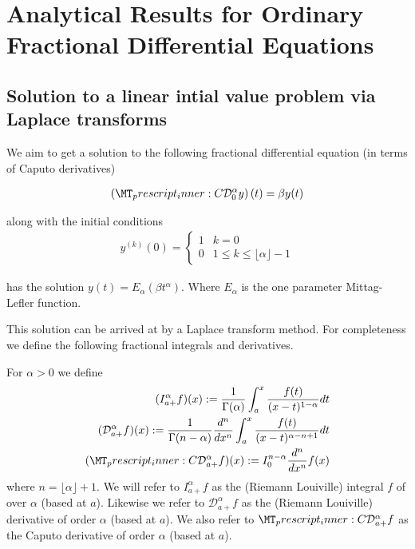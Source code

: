 \section{Analytical Results for Ordinary Fractional Differential Equations}
\subsection{Solution to a linear intial value problem via Laplace transforms}
We aim to get a solution to the following fractional differential equation (in terms of Caputo derivatives)

\begin{align}
	\label{eq:fde-1}
	\left( \prescript{C}{}{\mathcal{D}_0^\alpha}y \right)(t) = \beta y(t) 
\end{align}

along with the initial conditions 
\begin{align}
	\label{eq:fde-1-ic}
	y^{(k)}(0) = 
	\begin{cases}
		1 & k = 0 \\
		0 & 1 \leq k \leq \lfloor\alpha \rfloor - 1  
	\end{cases}
\end{align}

has the solution $ y(t) = E_\alpha \left( \beta t^\alpha \right) $. Where $ E_\alpha $ is the one parameter Mittag-Lefler function.

This solution can be arrived at by a Laplace transform method. For completeness we define the following fractional
integrals and derivatives.

\begin{definition}
	For $ \alpha > 0 $ we define
	\begin{align*}
		(I_{a+}^{\alpha}f)(x) := \frac{1}{\Gamma(\alpha)}\int_a^x \frac{f(t)}{(x-t)^{1 - \alpha}} dt \\
		(\mathcal{D}_{a+}^{\alpha}f)(x) := \frac{1}{\Gamma(n-\alpha)} \frac{d^n}{dx^n}\int_a^x \frac{f(t)}{(x-t)^{\alpha - n + 1}} dt \\
		(\prescript{C}{}{\mathcal{D}}_{a+}^\alpha f)(x) := I_{0}^{n-\alpha} \frac{d^n}{dx^n}f(x) 
	\end{align*}
	where $ n  = \lfloor \alpha \rfloor + 1$.
	We will refer to $ I_{a+}^\alpha f$ as the (Riemann Louiville) integral $ f $ of over $ \alpha $ (based at $ a $).
	Likewise we refer to $ \mathcal{D}_{a+}^\alpha f $ as the (Riemann Louiville) derivative of order $ \alpha $ (based at $ a $).
	We also refer to $ \prescript{C}{}{\mathcal{D}}_{a+}^\alpha f $ as the Caputo derivative of order $ \alpha $ (based at $ a $).
	
\end{definition}

